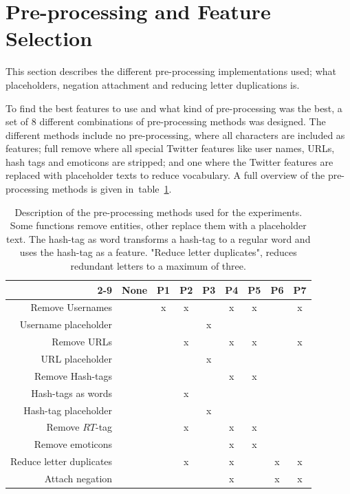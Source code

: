 \section{Pre-processing and Feature Selection}
This section describes the different pre-processing implementations used; what placeholders, negation attachment and reducing letter duplications is.

To find the best features to use and what kind of pre-processing was the best, a set of 8 different combinations of pre-processing methods was designed. The different methods include no pre-processing, where all characters are included as features; full remove where all special Twitter features like user names, URLs, hash tags and emoticons are stripped; and one where the Twitter features are replaced with placeholder texts to reduce vocabulary. A full overview of the pre-processing methods is given in~table~\ref{tab:preproc_desc}.

\begin{table}[t!]
	\centering
	\begin{tabular}{|r||c|c|c|c|c|c|c|c|}

		\cline{2-9}
	 \multicolumn{1}{c| }{ } & \textbf{None} & \textbf{P1} & \textbf{P2} & \textbf{P3} & \textbf{P4} & \textbf{P5} & \textbf{P6} & \textbf{P7}  \\ \hline
		Remove Usernames                     & & x & x &   & x & x & & x \\ \hline
		Username placeholder       & &   &   & x &   &   & & \\ \hline
		Remove URLs                          & &   & x &   & x & x & & x \\ \hline
		URL placeholder        & &   &   & x &   &   & & \\ \hline
		Remove Hash-tags                     & &   &   &   & x & x & & \\ \hline
		Hash-tags as words                   & &   & x &   &   &   & & \\ \hline
		Hash-tag placeholder          & &   &   & x &   &   & & \\ \hline
		Remove $RT$-tag                      & &   & x &   & x & x & & \\ \hline
		Remove emoticons                     & &   &   &   & x & x & & \\ \hline
		Reduce letter duplicates             & &   & x &   & x &   & x & x \\ \hline
		Attach negation  & &   &   &   & x &   & x & x \\ \hline
	\end{tabular}
	\caption[Description of used pre-processing methods]{Description of the pre-processing methods used for the experiments. Some functions remove entities, other replace them with a placeholder text. The hash-tag as word transforms a hash-tag to a regular word and uses the hash-tag as a feature. "Reduce letter duplicates", reduces redundant letters to a maximum of three.}
	\label{tab:preproc_desc}
\end{table}

